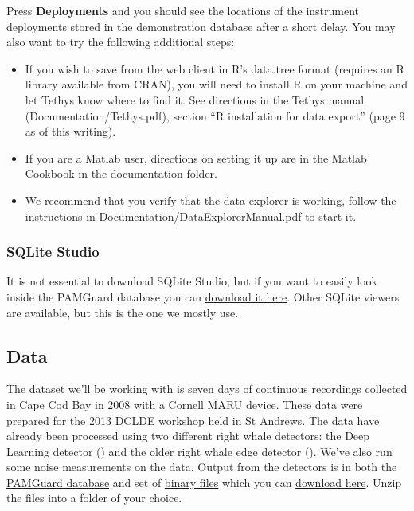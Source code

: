 \documentclass[
]{article}
\providecommand{\tightlist}{%
  \setlength{\itemsep}{0pt}\setlength{\parskip}{0pt}}\usepackage{longtable,booktabs,array}
\begin{document}
Press \textbf{Deployments} and you should see the locations of the
instrument deployments stored in the demonstration database after a
short delay. You may also want to try the following additional steps:

\begin{itemize}
\tightlist
\item
  If you wish to save from the web client in R's data.tree format
  (requires an R library available from CRAN), you will need to install
  R on your machine and let Tethys know where to find it. See directions
  in the Tethys manual (Documentation/Tethys.pdf), section ``R
  installation for data export'' (page 9 as of this writing).
\item
  If you are a Matlab user, directions on setting it up are in the
  Matlab Cookbook in the documentation folder.
\item
  We recommend that you verify that the data explorer is working, follow
  the instructions in Documentation/DataExplorerManual.pdf to start it.
\end{itemize}

\subsubsection{SQLite Studio}\label{sqlite-studio}

It is not essential to download SQLite Studio, but if you want to easily
look inside the PAMGuard database you can
\href{https://sqlitestudio.pl/}{download it here}. Other SQLite viewers
are available, but this is the one we mostly use.

\subsection{Data}\label{data}

The dataset we'll be working with is seven days of continuous recordings
collected in Cape Cod Bay in 2008 with a Cornell MARU device. These data
were prepared for the 2013 DCLDE workshop held in St Andrews. The data
have already been processed using two different right whale detectors:
the Deep Learning detector ()
and the older right whale edge detector
(). We've also run some
noise measurements on the data. Output from the detectors is in both the
\href{https://www.pamguard.org/olhelp/utilities/generalDatabaseHelp/docs/database_database.html}{PAMGuard
database} and set of
\href{https://www.pamguard.org/olhelp/utilities/BinaryStore/docs/binarystore_overview.html}{binary
files} which you can
\href{https://github.com/PAMGuardLearning/pamguard_tethys/releases/download/V1.1/NARWExampleDataset.zip}{download
here}. Unzip the files into a folder of your choice.
\end{document}
